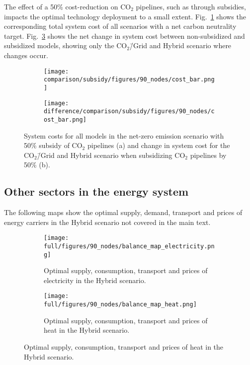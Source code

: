 \documentclass[twocolumn]{article}
\newcommand{\carbon}{CO$_2$}
\newcommand{\carbongrid}{CO$_2$\=/Grid}
\newcommand{\hybridscenario}{Hybrid scenario}
\begin{document}
The effect of a 50\% cost-reduction on \carbon{} pipelines, such as through subsidies, impacts the optimal technology deployment to a small extent. Fig.~\ref{fig:cost_bar_subsidy} shows the corresponding total system cost of all scenarios with a net carbon neutrality target. Fig.~\ref{fig:cost_bar_diff_subsidy} shows the net change in system cost between non-subsidized and subsidized models, showing only the \carbongrid{} and \hybridscenario{} where changes occur.

\begin{figure}[ht!]
    \centering
    \begin{subfigure}{.5\textwidth}
        \texttt{[image: comparison/subsidy/figures/90\_nodes/cost\_bar.png]}
        \caption{}
        \label{fig:cost_bar_subsidy}
    \end{subfigure}%
    \begin{subfigure}{.5\textwidth}
        \centering
        \texttt{[image: difference/comparison/subsidy/figures/90\_nodes/cost\_bar.png]}
        \caption{}
        \label{fig:cost_bar_diff_subsidy}
    \end{subfigure}
    \caption{System costs for all models in the net-zero emission scenario with 50\% subsidy of \carbon{} pipelines (a) and change in system cost for the \carbongrid{} and \hybridscenario{} when subsidizing \carbon{} pipelines by 50\% (b).}
\end{figure}

\clearpage
\subsection{Other sectors in the energy system}

The following maps show the optimal supply, demand, transport and prices of energy carriers in the \hybridscenario{} not covered in the main text.

\begin{figure}[ht!]
    \centering
    \begin{subfigure}{0.5\textwidth}
        \texttt{[image: full/figures/90\_nodes/balance\_map\_electricity.png]}
        \caption{Optimal supply, consumption, transport and prices of electricity in the \hybridscenario{}.}
        \label{fig:balance_map_electricity}
    \end{subfigure}%
    \begin{subfigure}{0.5\textwidth}
        \texttt{[image: full/figures/90\_nodes/balance\_map\_heat.png]}
        \caption{Optimal supply, consumption, transport and prices of heat in the \hybridscenario{}.}
        \label{fig:balance_map_heat}
    \end{subfigure}
\end{figure}
\end{document}
